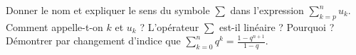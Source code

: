 %
%
\begin{tasks}
	\task Donner le nom et expliquer le sens du symbole $\sum$ dans l'expression  $\sum\limits_{k=p}^n u_k$.
	\task Comment appelle-t-on $k$ et $u_k$ ?
	\task L'opérateur $\sum$ est-il linéaire ? Pourquoi ?
    \task Démontrer par changement d'indice que $ \sum\limits_{k=0}^n q^k = \frac{1 - q^{n+1}}{1-q}$.
\end{tasks}
